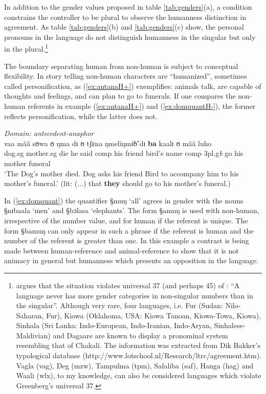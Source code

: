   In addition to
the gender values proposed in table \ref{tab:genders}(a),  a condition
constrains
the controller to be plural to observe the humanness distinction in
agreement. As table  \ref{tab:genders}(b)  and   \ref{tab:genders}(c) show, 
the personal pronouns in the language do not distinguish humanness in
 the singular but only in the plural.\footnote{\cite{Brin07c}  argues
that the situation  violates universal
  37 (and perhaps 45) of \cite{Gree63}: ``A language never has more
  gender categories in non-singular numbers than in the singular''.
  Although very rare, four languages, i.e. Fur (Sudan:  Nilo-Saharan, Fur), 
Kiowa (Oklahoma, USA: Kiowa Tanoan, Kiowa-Towa, Kiowa),  Sinhala (Sri
Lanka: Indo-European, Indo-Iranian,
  Indo-Aryan, Sinhalese-Maldivian) and Dagaare are known to display a pronominal
system resembling that of Chakali. The
information was extracted from Dik Bakker's typological database
(http://www.lotschool.nl/Research/ltrc/agreement.htm).  Vagla (vag),
Deg (mzw), Tampulma (tpm), Safaliba (saf), Hanga (hag) and Waali (wlx), to my
knowledge, can also be considered languages which violate Greenberg's
universal 37.} 

The boundary separating human from non-human is subject to conceptual
flexibility. In story telling non-human characters are ``humanized'', sometimes
called personification, as (\ref{ex:antanaH+}) exemplifies: animals talk, are
capable of thoughts and feelings, and can plan to go to funerals. If one
compares the non-human referents in example (\ref{ex:antanaH+}) and
(\ref{ex:domquantH-}), the former reflects personification, while the latter
does
not.


\begin{exe}
  \ex\label{ex:antanaH+}{\it Domain: antecedent-anaphor}\\
\gll   vaa  mãã  sʊwa   ʊ   ŋma   dɪ   ʊ  tʃɛna  ŋmeliŋmɪ̃ʊ̃   dɪ   
\textbf{ba}  kaalɪ  ʊ mãã     luho \\
       {dog.{\sc sg}} {mother.{\sc sg}} {die} {he} {said} {\sc comp} {his}
{friend} {bird's name} {\sc comp} {{\sc 3pl.g}{\it b}} {go} {his}
{mother} {funeral} \\
\glt `The Dog's mother died. Dog asks his friend Bird to accompany him to his
mother's funeral.'  (lit: (...) that \textbf{they} should go to his mother's
funeral.) 
\end{exe}





In (\ref{ex:domquant}) the quantifier {\S muŋ} `all'
agrees in gender with the nouns {\S nɪbaala} `men' and
{\S bɔlasa} `elephants'.  The form {\S amuŋ} is
used with non-human, irrespective of the number value, and for human if
the referent is unique. The form  {\S bamuŋ} can only  appear in such a phrase
if the referent is human and the number of the referent is greater than one. In
this example a contrast is being made between
human-reference and animal-reference to show that it is not animacy in general 
but
humanness
which presents an opposition in the language.



